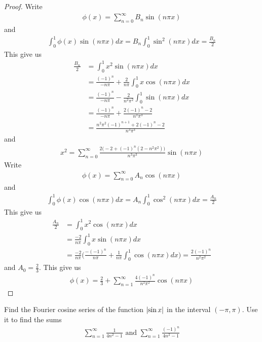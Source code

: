 \documentclass{report}
\begin{document}
\begin{proof}
Write 
\begin{align*}
  \phi (x)= \sum_{n=0}^{\infty}B_n \sin (n\pi x)
\end{align*}
and 
\begin{align*}
  \int_0^1 \phi (x) \sin (n \pi  x)dx= B_n\int_0^1 \sin^2(n \pi  x)dx=\frac{B_n}{2}
\end{align*}
This give us  
\begin{align*}
\frac{B_n}{2}&= \int_0^{1} x^2 \sin (n \pi x)dx  \\
&= \frac{(-1)^n}{- n \pi}+  \frac{2}{n \pi}\int_0^1 x \cos (n\pi x)dx\\
&= \frac{(-1)^n}{- n \pi} - \frac{2}{n^2 \pi^2 }\int_0^1 \sin(n\pi x)dx \\
&=\frac{(-1)^n}{-n \pi }+ \frac{2(-1)^n-2}{n^3\pi ^3}\\
&= \frac{n^2\pi ^2(-1)^{n+1}+ 2(-1)^n -2}{n^3\pi ^3}
\end{align*}
and 
\begin{align*}
x^2=\sum_{n=0}^{\infty} \frac{2\big(-2+(-1)^n(2-n^2\pi ^2) \big)}{n^3\pi ^3} \sin (n\pi  x)
\end{align*}
Write 
\begin{align*}
\phi (x)=\sum_{n=0}^{\infty}A_n \cos (n \pi  x) 
\end{align*}
and 
\begin{align*}
\int_0^1 \phi (x)\cos (n \pi  x)dx=A_n\int_0^1 \cos^2(n \pi  x)dx= \frac{A_n}{2}
\end{align*}
This give us 
\begin{align*}
\frac{A_n}{2}&= \int_0^1 x^2 \cos (n \pi  x)dx\\
&= \frac{-2}{n \pi }\int_0^1x \sin (n \pi  x)dx\\
&=\frac{-2}{n\pi }\Big( \frac{-(-1)^n}{n \pi }+ \frac{1}{n \pi }\int_0^1 \cos (n \pi x)dx \Big)= \frac{2(-1)^n}{n^2 \pi ^2}
\end{align*}
and $A_0=\frac{2}{3}$. This give us 
\begin{align*}
\phi (x)= \frac{2}{3}+\sum_{n=1}^{\infty} \frac{4(-1)^n}{n^2 \pi ^2}\cos (n \pi  x)
\end{align*}
\end{proof}
\begin{question}{}{}
Find the Fourier cosine series of the function $\left|\sin x\right|$ in the interval $(-\pi  ,\pi )$. Use it to find the sums 
\begin{align*}
\sum_{n=1}^{\infty} \frac{1}{4n^2-1}\text{ and }\sum_{n=1}^{\infty} \frac{(-1)^n}{4n^2-1}
\end{align*}
\end{question}
\end{document}

